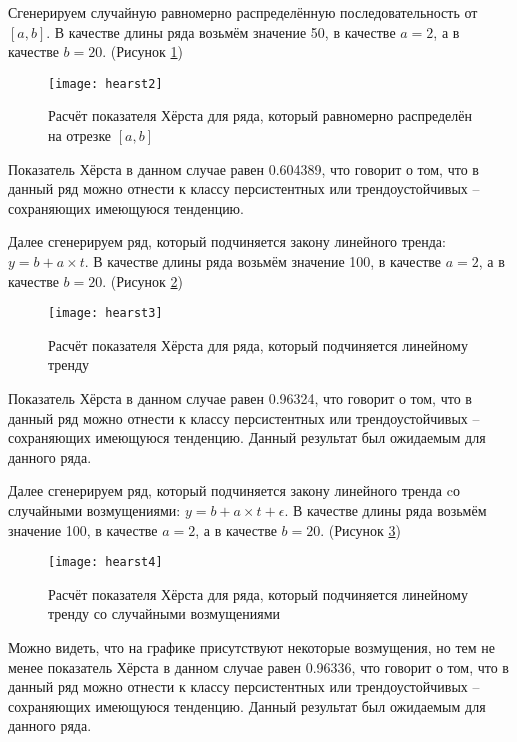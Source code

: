 Сгенерируем случайную равномерно распределённую последовательность от $[a, b]$. В качестве длины ряда возьмём значение 50, в качестве $a = 2$, а в качестве $b = 20$. (Рисунок \ref{fig:hearst2})
\begin{figure}[h]
	\centering \texttt{[image: hearst2]}
	\caption{Расчёт показателя Хёрста для ряда, который равномерно распределён на отрезке $[a, b]$}
	\label{fig:hearst2}
\end{figure}

Показатель Хёрста в данном случае равен 0.604389, что говорит о том, что в данный ряд можно отнести к классу персистентных или трендоустойчивых -- сохраняющих имеющуюся тенденцию.\\

\newpage

Далее сгенерируем ряд, который подчиняется закону линейного тренда: $y = b + a \times t$. В качестве длины ряда возьмём значение 100, в качестве $a = 2$, а в качестве $b = 20$. (Рисунок \ref{fig:hearst3})
\begin{figure}[h]
	\centering \texttt{[image: hearst3]}
	\caption{Расчёт показателя Хёрста для ряда, который подчиняется линейному тренду}
	\label{fig:hearst3}
\end{figure}

Показатель Хёрста в данном случае равен 0.96324, что говорит о том, что в данный ряд можно отнести к классу персистентных или трендоустойчивых -- сохраняющих имеющуюся тенденцию. Данный результат был ожидаемым для данного ряда.\\

\newpage

Далее сгенерируем ряд, который подчиняется закону линейного тренда cо случайными возмущениями: $y = b + a \times t + \epsilon$. В качестве длины ряда возьмём значение 100, в качестве $a = 2$, а в качестве $b = 20$. (Рисунок \ref{fig:hearst4})
\begin{figure}[h]
	\centering \texttt{[image: hearst4]}
	\caption{Расчёт показателя Хёрста для ряда, который подчиняется линейному тренду со случайными возмущениями}
	\label{fig:hearst4}
\end{figure}

Можно видеть, что на графике присутствуют некоторые возмущения, но тем не менее показатель Хёрста в данном случае равен 0.96336, что говорит о том, что в данный ряд можно отнести к классу персистентных или трендоустойчивых -- сохраняющих имеющуюся тенденцию. Данный результат был ожидаемым для данного ряда.\\

